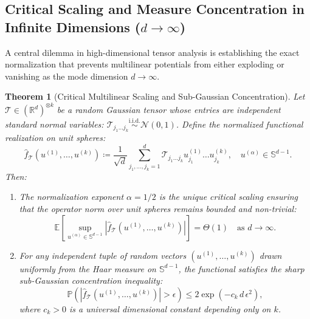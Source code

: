 \documentclass[11pt,a4paper,reqno]{amsart}
\newtheorem{theorem}{Theorem}[section]
\theoremstyle{definition}
\numberwithin{equation}{section}
\providecommand{\R}{\mathbb{R}}
\providecommand{\Sph}{\mathbb{S}}
\providecommand{\Sph}{\mathbb{S}}
\providecommand{\R}{\mathbb{R}}
\begin{document}
\subsection{Critical Scaling and Measure Concentration in Infinite Dimensions (\texorpdfstring{$d \to \infty$}{d -> infty})}
\label{subsec:measure_concentration}

A central dilemma in high-dimensional tensor analysis is establishing the exact normalization that prevents multilinear potentials from either exploding or vanishing as the mode dimension $d \to \infty$.

\begin{theorem}[Critical Multilinear Scaling and Sub-Gaussian Concentration]
\label{thm:critical_scaling}
Let $\mathcal{T} \in (\R^d)^{\otimes k}$ be a random Gaussian tensor whose entries are independent standard normal variables: $\mathcal{T}_{j_1 \dots j_k} \stackrel{\mathrm{i.i.d.}}{\sim} \mathcal{N}(0, 1)$. Define the normalized functional realization on unit spheres:
\begin{equation}
    \label{eq:renorm_tensor_form}
    \widehat{f}_{\mathcal{T}}(u^{(1)}, \dots, u^{(k)}) \coloneqq \frac{1}{\sqrt{d}} \sum_{j_1, \dots, j_k = 1}^d \mathcal{T}_{j_1 \dots j_k} u_{j_1}^{(1)} \dots u_{j_k}^{(k)}, \quad u^{(\alpha)} \in \Sph^{d-1}.
\end{equation}
Then:
\begin{enumerate}[label=(\roman*)]
    \item The normalization exponent $\alpha = 1/2$ is the unique critical scaling ensuring that the operator norm over unit spheres remains bounded and non-trivial:
    \begin{equation}
        \mathbb{E}\left[ \sup_{u^{(\alpha)} \in \Sph^{d-1}} |\widehat{f}_{\mathcal{T}}(u^{(1)}, \dots, u^{(k)})| \right] = \Theta(1) \quad \text{as } d \to \infty.
    \end{equation}
    \item For any independent tuple of random vectors $(u^{(1)}, \dots, u^{(k)})$ drawn uniformly from the Haar measure on $\Sph^{d-1}$, the functional satisfies the sharp sub-Gaussian concentration inequality:
    \begin{equation}
        \label{eq:concentration_inequality}
        \mathbb{P}\left( |\widehat{f}_{\mathcal{T}}(u^{(1)}, \dots, u^{(k)})| > \epsilon \right) \le 2 \exp\left( - c_k \, d \, \epsilon^2 \right),
    \end{equation}
    where $c_k > 0$ is a universal dimensional constant depending only on $k$.
\end{enumerate}
\end{theorem}
\end{document}
